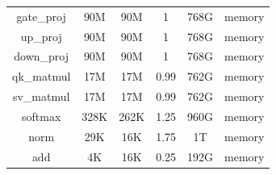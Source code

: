 \begin{table}[tb]
{\begin{tabular}{@{}cccccc@{}}
gate\_proj & 90M  & 90M                                                     & 1                                                              & 768G                                                      & memory  \\
up\_proj   & 90M  & 90M                                                     & 1                                                              & 768G                                                      & memory  \\
down\_proj & 90M  & 90M                                                     & 1                                                              & 768G                                                      & memory  \\
qk\_matmul & 17M  & 17M                                                     & 0.99                                                           & 762G                                                      & memory  \\
sv\_matmul & 17M  & 17M                                                     & 0.99                                                           & 762G                                                      & memory  \\
softmax    & 328K & 262K                                                    & 1.25                                                           & 960G                                                      & memory  \\
norm       & 29K  & 16K                                                     & 1.75                                                           & 1T                                                        & memory  \\
add        & 4K   & 16K                                                     & 0.25                                                           & 192G                                                      & memory  \\ \bottomrule
\end{tabular}
}
\end{table}

